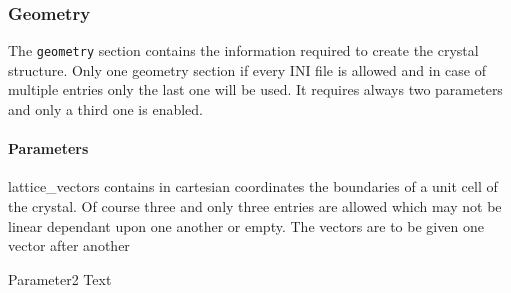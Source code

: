 \subsubsection{Geometry}
The \lstinline{geometry} section contains the information required to create the crystal structure. Only one geometry section if every INI file is allowed and in case of multiple entries only the last one will be used. It requires always two parameters and only a third one is enabled.
\paragraph{Parameters}
\begin{description}
 \item{lattice_vectors} contains in cartesian coordinates the boundaries of a unit cell of the crystal. Of course three and only three entries are allowed which may not be linear dependant upon one another or empty. The vectors are to be given one vector after another
 \item{Parameter2} Text
\end{description}
